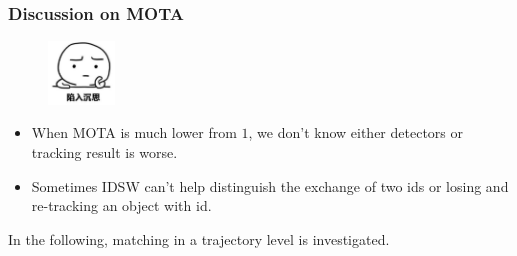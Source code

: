 \documentclass[slidetop, mathserif, dvipsnames]{beamer}
\begin{document}
\begin{frame}
	\frametitle{Discussion on MOTA}

	\begin{minipage}{50pt}
		\begin{figure}
			\includegraphics[width=50pt]{pics/question2.png}
		\end{figure}
	\end{minipage}
	\begin{minipage}{250pt}
	\begin{itemize}
	\item When MOTA is much lower from $1$, we don't know either detectors or tracking result is worse.
	\item Sometimes IDSW can't help distinguish the exchange of two ids or
		losing and re-tracking an object with id.
	\end{itemize}
	\end{minipage}

	\vspace{10pt}

	In the following, matching in a trajectory level is investigated.

\end{frame}

\end{document}

